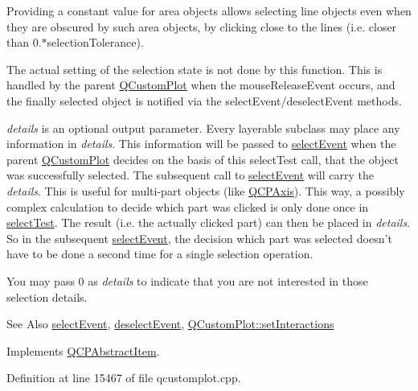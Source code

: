 Providing a constant value for area objects allows selecting line objects even when they are obscured by such area objects, by clicking close to the lines (i.\-e. closer than 0.$\ast$selection\-Tolerance).

The actual setting of the selection state is not done by this function. This is handled by the parent \hyperlink{class_q_custom_plot}{Q\-Custom\-Plot} when the mouse\-Release\-Event occurs, and the finally selected object is notified via the select\-Event/deselect\-Event methods.

{\itshape details} is an optional output parameter. Every layerable subclass may place any information in {\itshape details}. This information will be passed to \hyperlink{class_q_c_p_abstract_item_aaf92af7b9893712959a6c073d334d88d}{select\-Event} when the parent \hyperlink{class_q_custom_plot}{Q\-Custom\-Plot} decides on the basis of this select\-Test call, that the object was successfully selected. The subsequent call to \hyperlink{class_q_c_p_abstract_item_aaf92af7b9893712959a6c073d334d88d}{select\-Event} will carry the {\itshape details}. This is useful for multi-\/part objects (like \hyperlink{class_q_c_p_axis}{Q\-C\-P\-Axis}). This way, a possibly complex calculation to decide which part was clicked is only done once in \hyperlink{class_q_c_p_item_text_a285b95bb6634c2e4f7768abb7a8bc69c}{select\-Test}. The result (i.\-e. the actually clicked part) can then be placed in {\itshape details}. So in the subsequent \hyperlink{class_q_c_p_abstract_item_aaf92af7b9893712959a6c073d334d88d}{select\-Event}, the decision which part was selected doesn't have to be done a second time for a single selection operation.

You may pass 0 as {\itshape details} to indicate that you are not interested in those selection details.

\begin{DoxySeeAlso}{See Also}
\hyperlink{class_q_c_p_abstract_item_aaf92af7b9893712959a6c073d334d88d}{select\-Event}, \hyperlink{class_q_c_p_abstract_item_a91f090d6763cfedb0749219c63788ae9}{deselect\-Event}, \hyperlink{class_q_custom_plot_a5ee1e2f6ae27419deca53e75907c27e5}{Q\-Custom\-Plot\-::set\-Interactions} 
\end{DoxySeeAlso}


Implements \hyperlink{class_q_c_p_abstract_item_a96d522d10ffc0413b9a366c6f7f0476b}{Q\-C\-P\-Abstract\-Item}.



Definition at line 15467 of file qcustomplot.\-cpp.

